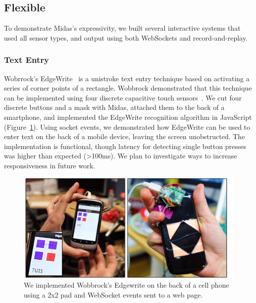     \subsection{Flexible}
    
    To demonstrate Midas's expressivity, we built several interactive systems that used all sensor types, and output using both WebSockets and record-and-replay.
    
        \subsubsection{Text Entry}
Wobrrock's EdgeWrite~\cite{wobbrock-edgewrite} is a unistroke text entry technique based on activating a series of corner points of a rectangle. Wobbrock demonstrated that this technique can be implemented using four discrete capacitive touch sensors~\cite{edgewrite-cap}. We cut four discrete buttons and a mask with Midas, attached them to the back of a smartphone, and implemented the EdgeWrite recognition algorithm in JavaScript (Figure~\ref{fig:midas-edgewrite}). Using socket events, we demonstrated how EdgeWrite can be used to enter text on the back of a mobile device, leaving the screen unobstructed. The implementation is functional, though latency for detecting single button presses was higher than expected (\textgreater 100ms). We plan to investigate ways to increase responsiveness in future work.

\begin{figure}[t]
\centering
\includegraphics[width=\textwidth]{figures/midas/edgewrite.jpg}
\caption{We implemented Wobbrock's Edgewrite on the back of a cell phone using a 2x2 pad and WebSocket events sent to a web page.} 
\label{fig:midas-edgewrite}
\end{figure}

